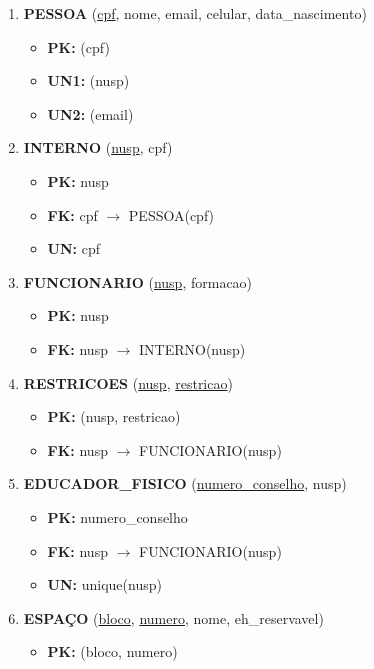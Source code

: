 \documentclass{article}
\begin{document}
\begin{enumerate}
    \item \textbf{PESSOA} (\underline{cpf}, nome, email, celular, data\_nascimento)
        \begin{itemize}
            \item \textbf{PK:} (cpf)
            \item \textbf{UN1:} (nusp)
            \item \textbf{UN2:} (email)
        \end{itemize}

    \item \textbf{INTERNO} (\underline{nusp}, cpf)
        \begin{itemize}
            \item \textbf{PK:} nusp
            \item \textbf{FK:} cpf $\rightarrow$ PESSOA(cpf)
            \item \textbf{UN:} cpf
        \end{itemize}

    \item \textbf{FUNCIONARIO} (\underline{nusp}, formacao)
        \begin{itemize}
            \item \textbf{PK:} nusp
            \item \textbf{FK:} nusp $\rightarrow$ INTERNO(nusp)
        \end{itemize}
        
    \item \textbf{RESTRICOES} (\underline{nusp}, \underline{restricao})
        \begin{itemize}
            \item \textbf{PK:} (nusp, restricao)
            \item \textbf{FK:} nusp $\rightarrow$ FUNCIONARIO(nusp)
        \end{itemize}

    \item \textbf{EDUCADOR\_FISICO} (\underline{numero\_conselho}, nusp)
        \begin{itemize}
            \item \textbf{PK:} numero\_conselho
            \item \textbf{FK:} nusp $\rightarrow$ FUNCIONARIO(nusp)
            \item \textbf{UN:} unique(nusp)
        \end{itemize}

    \item \textbf{ESPAÇO} (\underline{bloco}, \underline{numero}, nome, eh\_reservavel)
        \begin{itemize}
            \item \textbf{PK:} (bloco, numero)
        \end{itemize}


\end{enumerate}
\end{document}
